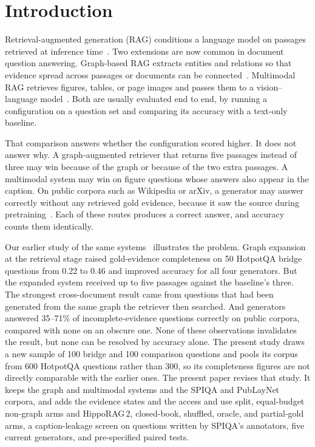 \documentclass[preprint,12pt]{elsarticle}
\begin{document}
\section{Introduction}
\label{sec:intro}

Retrieval-augmented generation (RAG) conditions a language model on passages
retrieved at inference time~\cite{lewis2020rag,gao2023survey}. Two extensions
are now common in document question answering. Graph-based RAG extracts
entities and relations so that evidence spread across passages or documents
can be connected~\cite{edge2024graphrag,hipporag,guo2024lightrag}. Multimodal
RAG retrieves figures, tables, or page images and passes them to a
vision--language model~\cite{faysse2024colpali,cho2024m3docrag,dong2025mmdocrag}.
Both are usually evaluated end to end, by running a configuration on a
question set and comparing its accuracy with a text-only baseline.

That comparison answers whether the configuration scored higher. It does not
answer why. A graph-augmented retriever that returns five passages instead of
three may win because of the graph or because of the two extra passages. A
multimodal system may win on figure questions whose answers also appear in the
caption. On public corpora such as Wikipedia or arXiv, a generator may answer
correctly without any retrieved gold evidence, because it saw the source during
pretraining~\cite{roberts2020knowledge,mallen2023popqa,kandpal2023longtail}.
Each of these routes produces a correct answer, and accuracy counts them
identically.

Our earlier study of the same systems~\cite{jonah2026whendo} illustrates the
problem. Graph expansion at the retrieval stage raised gold-evidence
completeness on 50 HotpotQA bridge questions from 0.22 to 0.46 and improved
accuracy for all four generators. But the expanded system received up to five
passages against the baseline's three. The strongest cross-document result came
from questions that had been generated from the same graph the retriever then
searched. And generators answered 35--71\% of incomplete-evidence questions
correctly on public corpora, compared with none on an obscure one. None of these
observations invalidates the result, but none can be resolved by accuracy
alone. The present study draws a new sample of 100 bridge and 100 comparison
questions and pools its corpus from 600 HotpotQA questions rather than 300,
so its completeness figures are not directly comparable with the earlier
ones. The present paper revises that study. It keeps the graph and
multimodal systems and the SPIQA and PubLayNet corpora, and adds the evidence
states and the access and use split, equal-budget non-graph arms and
HippoRAG\,2, closed-book, shuffled, oracle, and partial-gold arms, a
caption-leakage screen on questions written by SPIQA's annotators, five
current generators, and pre-specified paired tests.
\end{document}

